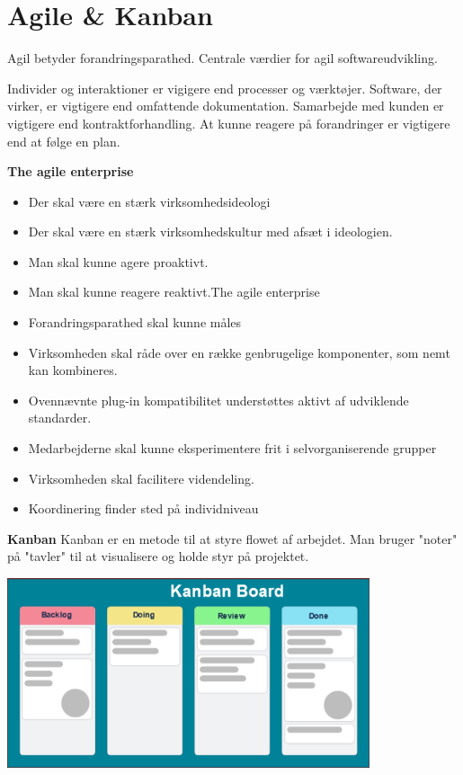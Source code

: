 \section{Agile \& Kanban}

Agil betyder forandringsparathed.
Centrale værdier for agil softwareudvikling.

Individer og interaktioner er vigigere end processer og værktøjer. Software, der virker, er vigtigere end omfattende dokumentation.
Samarbejde med kunden er vigtigere end kontraktforhandling. At kunne reagere på forandringer er vigtigere end at følge en plan.


\textbf{The agile enterprise}
\begin{itemize}
	\item{Der skal være en stærk virksomhedsideologi}
	\item{Der skal være en stærk virksomhedskultur med afsæt i ideologien.}
	\item{Man skal kunne agere proaktivt.}
	\item{Man skal kunne reagere reaktivt.The agile enterprise}
	\item{Forandringsparathed skal kunne måles}
	\item{Virksomheden skal råde over en række genbrugelige komponenter, som nemt kan kombineres.}
	\item{Ovennævnte plug-in kompatibilitet understøttes aktivt af udviklende standarder.}
	\item{Medarbejderne skal kunne eksperimentere frit i selvorganiserende grupper}
	\item{Virksomheden skal facilitere videndeling.}
	\item {Koordinering finder sted på individniveau}
\end{itemize}

\textbf{Kanban}
Kanban er en metode til at styre flowet af arbejdet. Man bruger "noter" på "tavler" til at visualisere og holde styr på projektet.

\begin{center}
	\includegraphics[width=0.8\textwidth]{Images/Kanban.png}
\end{center}

